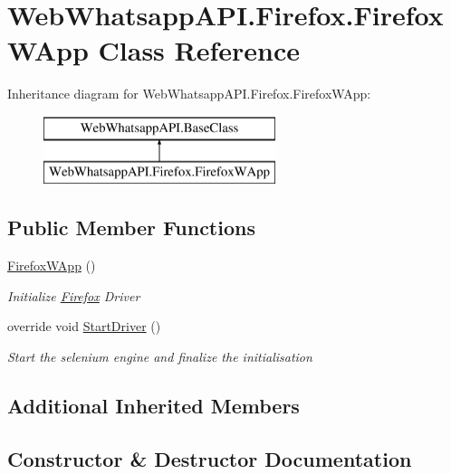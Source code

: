 \hypertarget{class_web_whatsapp_a_p_i_1_1_firefox_1_1_firefox_w_app}{}\section{Web\+Whatsapp\+A\+P\+I.\+Firefox.\+Firefox\+W\+App Class Reference}
\label{class_web_whatsapp_a_p_i_1_1_firefox_1_1_firefox_w_app}
Inheritance diagram for Web\+Whatsapp\+A\+P\+I.\+Firefox.\+Firefox\+W\+App\+:\begin{figure}[H]
\begin{center}
\leavevmode
\includegraphics[height=2.000000cm]{class_web_whatsapp_a_p_i_1_1_firefox_1_1_firefox_w_app}
\end{center}
\end{figure}
\subsection*{Public Member Functions}
\begin{DoxyCompactItemize}
\item 
\hyperlink{class_web_whatsapp_a_p_i_1_1_firefox_1_1_firefox_w_app_a0c7a2248a6cf1699443a3ec99a17ba6d}{Firefox\+W\+App} ()
\begin{DoxyCompactList}\small\item\em Initialize \hyperlink{namespace_web_whatsapp_a_p_i_1_1_firefox}{Firefox} Driver \end{DoxyCompactList}\item 
override void \hyperlink{class_web_whatsapp_a_p_i_1_1_firefox_1_1_firefox_w_app_a80f406639e59bc4152b8f255962607f2}{Start\+Driver} ()
\begin{DoxyCompactList}\small\item\em Start the selenium engine and finalize the initialisation \end{DoxyCompactList}\end{DoxyCompactItemize}
\subsection*{Additional Inherited Members}


\subsection{Constructor \& Destructor Documentation}
\mbox{\label{class_web_whatsapp_a_p_i_1_1_firefox_1_1_firefox_w_app_a0c7a2248a6cf1699443a3ec99a17ba6d}} 

